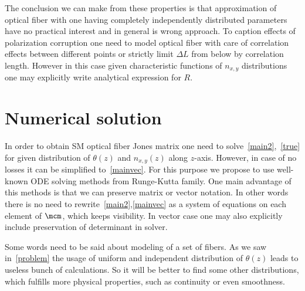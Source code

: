 \documentclass[12pt, notitlepage]{report}
\begin{document}
The conclusion we can make from these properties is that approximation of optical fiber with one having completely independently distributed parameters have no practical interest and in general is wrong approach. To caption effects of polarization corruption one need to model optical fiber with care of correlation effects between different points or strictly limit $\Delta L$ from below by correlation length. However in this case given characteristic functions of $n_{x,y}$ distributions one may explicitly write analytical expression for $R$.

\section{Numerical solution}
In order to obtain SM optical fiber Jones matrix one need to solve~\eqref{main2},~\eqref{true} for given distribution of $\theta(z)$ and $n_{x,y}(z)$ along $z$-axis. However, in case of no losses it can be simplified to~\eqref{mainvec}. For this purpose we propose to use well-known ODE solving methods from Runge-Kutta family. One main advantage of this methods is that we can preserve matrix or vector notation. In other words there is no need to rewrite~\eqref{main2},\eqref{mainvec} as a system of equations on each element of $\mcm$, which keeps visibility. In vector case one may also explicitly include preservation of determinant in solver.

Some words need to be said about modeling of a set of fibers. As we saw in~\ref{problem} the usage of uniform and independent distribution of $\theta(z)$ leads to useless bunch of calculations. So it will be better to find some other distributions, which fulfills more physical properties, such as continuity or even smoothness.
	
\end{document}
